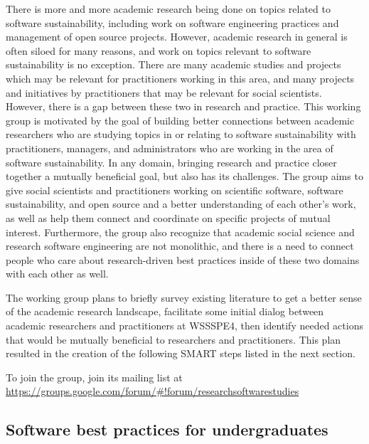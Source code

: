 \documentclass[11pt, oneside]{amsart}
\newcommand{\note}[1]{ {\textcolor{blueish}    { ***Note:      #1 }}}
\begin{document}




There is more and more academic research being done on topics related to software sustainability, including work on software engineering practices and management of open source projects. However, academic research in general is often siloed for many reasons, and work on topics relevant to software sustainability is no exception. There are many academic studies and projects which may be relevant for practitioners working in this area, and many projects and initiatives by practitioners that may be relevant for social scientists. However, there is a gap between these two in research and practice.
%
This working group is motivated by the goal of building better connections between academic researchers who are studying topics in or relating to software sustainability with practitioners, managers, and administrators who are working in the area of software sustainability.
%
 In any domain, bringing research and practice closer together a mutually beneficial goal, but also has its challenges.
The group aims to give social scientists and practitioners working on scientific software, software sustainability, and open source and a better understanding of each other's work, as well as help them connect and coordinate on specific projects of mutual interest.
%
Furthermore, the group also recognize that academic social science and research software engineering are not monolithic, and there is a need to connect people who care about research-driven best practices inside of these two domains with each other as well.

The working group plans to briefly survey existing literature to get a better sense of the academic research landscape, facilitate some initial dialog between academic researchers and practitioners at WSSSPE4, then identify needed actions that would be mutually beneficial to researchers and practitioners. This plan resulted in the creation of the following SMART steps listed in the next section.


To join the group, join its mailing list at \url{https://groups.google.com/forum/#!forum/researchsoftwarestudies}


\subsection{Software best practices for undergraduates}
\label{sec:best-practices-undergrads}
\end{document}
